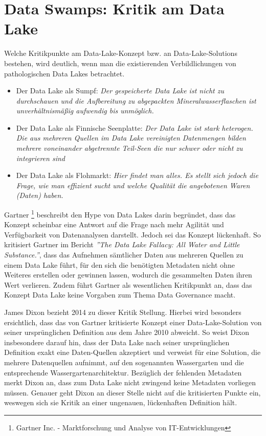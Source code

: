 \documentclass[twoside,twocolumn]{article}
\begin{document}
\section{Data Swamps: Kritik am Data Lake}
Welche Kritikpunkte am Data-Lake-Konzept bzw. an Data-Lake-Solutions bestehen, wird deutlich, wenn man die existierenden Verbildlichungen von pathologischen Data Lakes betrachtet.
\begin{itemize}
	\item Der Data Lake als Sumpf: \textit{Der gespeicherte Data Lake ist nicht zu durchschauen und die Aufbereitung zu abgepackten Mineralwasserflaschen ist unverhältnismäßig aufwendig bis unmöglich.\cite{src3}}
	\item Der Data Lake als Finnische Seenplatte:  \textit{Der Data Lake ist stark heterogen. Die aus mehreren Quellen im Data Lake vereinigten Datenmengen bilden mehrere voneinander abgetrennte Teil-Seen die nur schwer oder nicht zu integrieren sind\cite{src13}} 
	\item Der Data Lake als Flohmarkt: \textit{Hier findet man alles. Es stellt sich jedoch die Frage, wie man effizient sucht und welche Qualität die angebotenen Waren (Daten) haben.\cite{src12}} 
\end{itemize}

Gartner \footnote{Gartner Inc. - Marktforschung und Analyse von IT-Entwicklungen} beschreibt den Hype von Data Lakes darin begründet, dass das Konzept scheinbar eine Antwort auf die Frage nach mehr Agilität und Verfügbarkeit von Datenanalysen darstellt. Jedoch sei das Konzept lückenhaft. So kritisiert Gartner im Bericht \textit{''The Data Lake Fallacy: All Water and Little Substance.''}, dass das Aufnehmen sämtlicher Daten aus mehreren Quellen zu einem Data Lake führt, für den sich die benötigten Metadaten nicht ohne Weiteres erstellen oder gewinnen lassen, wodurch die gesammelten Daten ihren Wert verlieren. Zudem führt Gartner als wesentlichen Kritikpunkt an, dass das Konzept Data Lake keine Vorgaben zum Thema Data Governance macht.\cite{src3}

James Dixon bezieht 2014 zu dieser Kritik Stellung. Hierbei wird besonders ersichtlich, dass das von Gartner kritisierte Konzept einer Data-Lake-Solution von seiner ursprünglichen Definition aus dem Jahre 2010 abweicht. \cite{src14} So weist Dixon insbesondere darauf hin, dass der Data Lake nach seiner ursprünglichen Definition exakt eine Daten-Quellen akzeptiert und verweist für eine Solution, die mehrere Datenquellen aufnimmt, auf den sogenannten Wassergarten und die entsprechende Wassergartenarchitektur.\cite{src15} Bezüglich der fehlenden Metadaten merkt Dixon an, dass zum Data Lake nicht zwingend keine Metadaten vorliegen müssen. Genauer geht Dixon an dieser Stelle nicht auf die kritisierten Punkte ein, weswegen sich sie Kritik an einer ungenauen, lückenhaften Definition hält.
\end{document}
